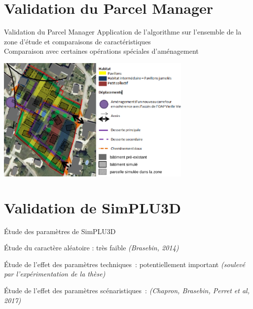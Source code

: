 \documentclass[xcolor=table]{beamer}
\begin{document}
\section{Validation du Parcel Manager}

\begin{frame}{Validation du Parcel Manager}
	Application de l'algorithme sur l'ensemble de la zone d'étude et comparaisons de caractéristiques
	\\
	Comparaison avec certaines opérations spéciales d'aménagement
	\begin{block}{}
		\includegraphics[width=9.5cm]{Images/OAPTour-de-Say2.png}
	\end{block}
\end{frame}

\section{Validation de SimPLU3D}

\begin{frame}{}
	\begin{block}{Étude des paramètres de SimPLU3D}
	\begin{block}{}
		Étude du caractère aléatoire : très faible \textit{(Brasebin, 2014)}
	\end{block}
	\begin{block}{}
		Étude de l'effet des paramètres techniques~: potentiellement important \textit{(soulevé par l'expérimentation de la thèse)}
	\end{block}
	\begin{block}{}
		Étude de l'effet des paramètres scénaristiques~: \textit{(Chapron, Brasebin, Perret et al, 2017)}
	\end{block}
\end{block}

\end{frame}
\end{document}

